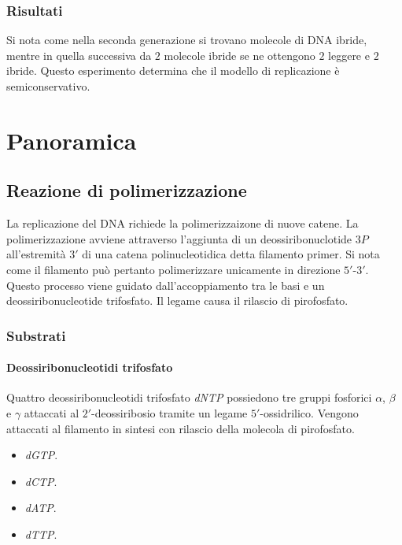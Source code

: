 		\subsubsection{Risultati}
		Si nota come nella seconda generazione si trovano molecole di DNA ibride, mentre in quella successiva da $2$ molecole ibride se ne ottengono $2$ leggere e $2$ ibride.
		Questo esperimento determina che il modello di replicazione \`e semiconservativo.


\section{Panoramica}

	\subsection{Reazione di polimerizzazione}
	La replicazione del DNA richiede la polimerizzaizone di nuove catene.
	La polimerizzazione avviene attraverso l'aggiunta di un deossiribonuclotide $3P$ all'estremit\`a $3'$ di una catena polinucleotidica detta filamento primer.
	Si nota come il filamento pu\`o pertanto polimerizzare unicamente in direzione $5'$-$3'$.
	Questo processo viene guidato dall'accoppiamento tra le basi e un deossiribonucleotide trifosfato.
	Il legame causa il rilascio di pirofosfato.

		\subsubsection{Substrati}

			\paragraph{Deossiribonucleotidi trifosfato}
			Quattro deossiribonucleotidi trifosfato \emph{dNTP} possiedono tre gruppi fosforici $\alpha$, $\beta$ e $\gamma$ attaccati al $2'$-deossiribosio tramite un legame $5'$-ossidrilico.
			Vengono attaccati al filamento in sintesi con rilascio della molecola di pirofosfato.
			\begin{multicols}{4}
				\begin{itemize}
					\item \emph{dGTP}.
					\item \emph{dCTP}.
					\item \emph{dATP}.
					\item \emph{dTTP}.
				\end{itemize}
			\end{multicols}

